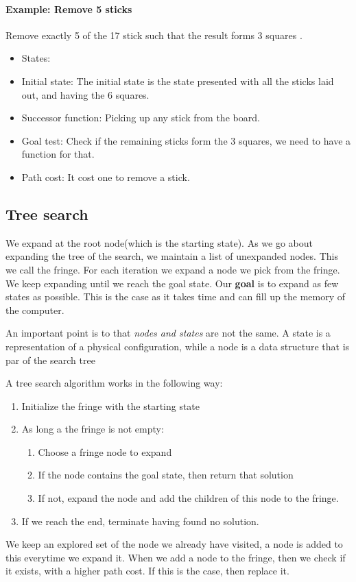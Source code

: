 \documentclass{article}
\begin{document}
\paragraph{Example: Remove 5 sticks}
Remove exactly 5 of the 17 stick such that the result forms 3
squares \cite[p. 18]{presentation:solving_problems_by_searching}.

\begin{itemize}
  \item States: 
  \item Initial state: The initial state is the state presented with all the
    sticks laid out, and having the 6 squares.
  \item Successor function: Picking up any stick from the board.
  \item Goal test: Check if the remaining sticks form the 3 squares, we need to
    have a function for that.
  \item Path cost: It cost one to remove a stick.
\end{itemize}


\subsection{Tree search}

We expand at the root node(which is the starting state). As we go about
expanding the tree of the search, we maintain a list of unexpanded nodes. This
we call the fringe. For each iteration we expand a node we pick from the fringe.
We keep expanding until we reach the goal state. Our \textbf{goal} is to expand
as few states as possible. This is the case as it takes time and can fill up the
memory of the computer.

An important point is to that \emph{nodes and states} are not the same. A state
is a representation of a physical configuration, while a node is a data
structure that is par of the search tree\cite[p.
19]{presentation:solving_problems_by_searching}

A tree search algorithm works in the following way:
\begin{enumerate}
  \item Initialize the fringe with the starting state
  \item As long a the fringe is not empty:
    \begin{enumerate}
      \item Choose a fringe node to expand
      \item If the node contains the goal state, then return that solution
      \item If not, expand the node and add the children of this node to the
        fringe.
    \end{enumerate}
  \item If we reach the end, terminate having found no solution.
\end{enumerate}
We keep an explored set of the node we already have visited, a node is added to
this everytime we expand it. When we add a node to the fringe, then we check if
it exists, with a higher path cost. If this is the case, then replace it.
\end{document}
